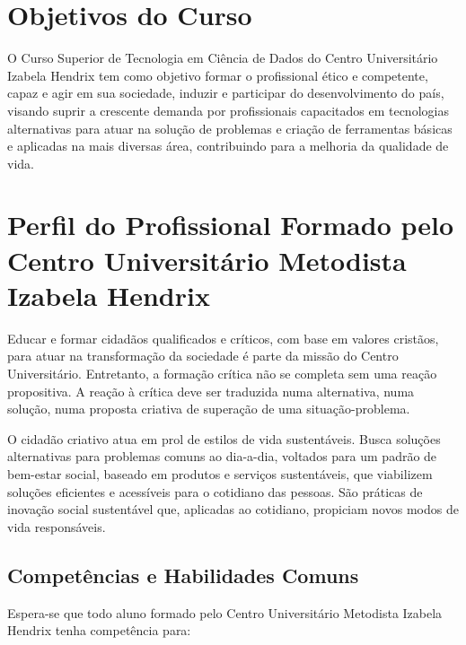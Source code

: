 \documentclass[a4paper, 12pt, openright, oneside, german, french, english, brazil]{abntex2}
\begin{document}
\chapter{Objetivos do Curso}

O Curso Superior de Tecnologia em Ciência de Dados do Centro Universitário Izabela Hendrix tem como objetivo formar o profissional ético e competente, capaz e agir em sua sociedade, induzir e participar do desenvolvimento do país, visando suprir a crescente demanda por profissionais capacitados em tecnologias alternativas para atuar na solução de problemas e criação de ferramentas básicas e aplicadas na mais diversas área, contribuindo para a melhoria da qualidade de vida.

\chapter{Perfil do Profissional Formado pelo Centro Universitário Metodista Izabela Hendrix}

Educar e formar cidadãos qualificados e críticos, com base em valores cristãos, para atuar na transformação da sociedade é parte da missão do Centro Universitário. Entretanto, a formação crítica não se completa sem uma reação propositiva. A reação à crítica deve ser traduzida numa alternativa, numa solução, numa proposta criativa de superação de uma situação-problema.

O cidadão criativo atua em prol de estilos de vida sustentáveis. Busca soluções alternativas para problemas comuns ao dia-a-dia, voltados para um padrão de bem-estar social, baseado em produtos e serviços sustentáveis, que viabilizem soluções eficientes e acessíveis para o cotidiano das pessoas. São práticas de inovação social sustentável que, aplicadas ao cotidiano, propiciam novos modos de vida responsáveis.

\section{Competências e Habilidades Comuns}

Espera-se que todo aluno formado pelo Centro Universitário Metodista Izabela Hendrix tenha competência para:
\end{document}
